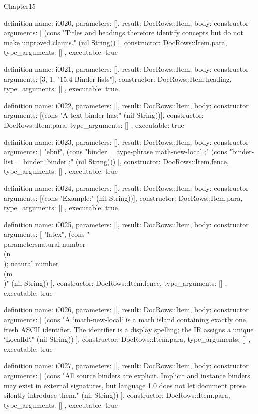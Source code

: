 \begin{lexlean}{Chapter15}
\begin{semanticmodule}
definition{
  name: i0020,
  parameters: [],
  result: DocRows::Item,
  body: constructor{
    arguments: [
      (cons "Titles and headings therefore identify concepts but do not make unproved claims." (nil String))
    ],
    constructor: DocRows::Item.para,
    type_arguments: []
  },
  executable: true
}

definition{
  name: i0021,
  parameters: [],
  result: DocRows::Item,
  body: constructor{
    arguments: [3, 1, "15.4 Binder lists"],
    constructor: DocRows::Item.heading,
    type_arguments: []
  },
  executable: true
}

definition{
  name: i0022,
  parameters: [],
  result: DocRows::Item,
  body: constructor{
    arguments: [(cons "A text binder has:" (nil String))],
    constructor: DocRows::Item.para,
    type_arguments: []
  },
  executable: true
}

definition{
  name: i0023,
  parameters: [],
  result: DocRows::Item,
  body: constructor{
    arguments: [
      "ebnf",
      (cons "binder      = type-phrase math-new-local ;" (cons "binder-list = binder { \";\" binder } ;" (nil String)))
    ],
    constructor: DocRows::Item.fence,
    type_arguments: []
  },
  executable: true
}

definition{
  name: i0024,
  parameters: [],
  result: DocRows::Item,
  body: constructor{
    arguments: [(cons "Example:" (nil String))],
    constructor: DocRows::Item.para,
    type_arguments: []
  },
  executable: true
}

definition{
  name: i0025,
  parameters: [],
  result: DocRows::Item,
  body: constructor{
    arguments: [
      "latex",
      (cons "\\parameters{natural number \\(n\\); natural number \\(m\\)}" (nil String))
    ],
    constructor: DocRows::Item.fence,
    type_arguments: []
  },
  executable: true
}

definition{
  name: i0026,
  parameters: [],
  result: DocRows::Item,
  body: constructor{
    arguments: [
      (cons "A `math-new-local` is a math island containing exactly one fresh ASCII identifier. The identifier is a display spelling; the IR assigns a unique `LocalId`." (nil String))
    ],
    constructor: DocRows::Item.para,
    type_arguments: []
  },
  executable: true
}

definition{
  name: i0027,
  parameters: [],
  result: DocRows::Item,
  body: constructor{
    arguments: [
      (cons "All source binders are explicit. Implicit and instance binders may exist in external signatures, but language 1.0 does not let document prose silently introduce them." (nil String))
    ],
    constructor: DocRows::Item.para,
    type_arguments: []
  },
  executable: true
}


\end{semanticmodule}
\end{lexlean}
